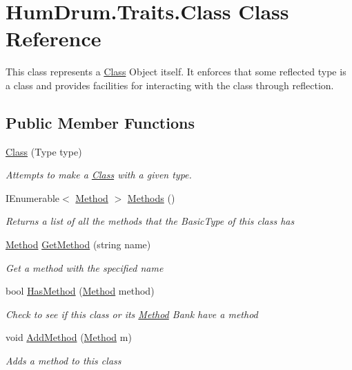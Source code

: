 \hypertarget{classHumDrum_1_1Traits_1_1Class}{}\section{Hum\+Drum.\+Traits.\+Class Class Reference}
\label{classHumDrum_1_1Traits_1_1Class}


This class represents a \hyperlink{classHumDrum_1_1Traits_1_1Class}{Class} Object itself. It enforces that some reflected type is a class and provides facilities for interacting with the class through reflection.  


\subsection*{Public Member Functions}
\begin{DoxyCompactItemize}
\item 
\hyperlink{classHumDrum_1_1Traits_1_1Class_a2f7f0cfcbefa2100fbb6bc9d091069fa}{Class} (Type type)
\begin{DoxyCompactList}\small\item\em Attempts to make a \hyperlink{classHumDrum_1_1Traits_1_1Class}{Class} with a given type. \end{DoxyCompactList}\item 
I\+Enumerable$<$ \hyperlink{classHumDrum_1_1Traits_1_1Method}{Method} $>$ \hyperlink{classHumDrum_1_1Traits_1_1Class_adf046d08365c036066725097f1569d26}{Methods} ()
\begin{DoxyCompactList}\small\item\em Returns a list of all the methods that the Basic\+Type of this class has \end{DoxyCompactList}\item 
\hyperlink{classHumDrum_1_1Traits_1_1Method}{Method} \hyperlink{classHumDrum_1_1Traits_1_1Class_a0578445375773453f293c11fe00fdb2d}{Get\+Method} (string name)
\begin{DoxyCompactList}\small\item\em Get a method with the specified name \end{DoxyCompactList}\item 
bool \hyperlink{classHumDrum_1_1Traits_1_1Class_af86be39a6fafc31213dfe17dd91064ea}{Has\+Method} (\hyperlink{classHumDrum_1_1Traits_1_1Method}{Method} method)
\begin{DoxyCompactList}\small\item\em Check to see if this class or its \hyperlink{classHumDrum_1_1Traits_1_1Method}{Method} Bank have a method \end{DoxyCompactList}\item 
void \hyperlink{classHumDrum_1_1Traits_1_1Class_a5608ddb29867686b73bcd824af8886dc}{Add\+Method} (\hyperlink{classHumDrum_1_1Traits_1_1Method}{Method} m)
\begin{DoxyCompactList}\small\item\em Adds a method to this class \end{DoxyCompactList}\end{DoxyCompactItemize}
